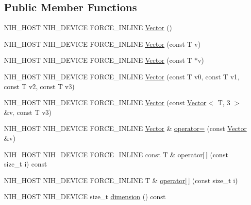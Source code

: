 \subsection*{\-Public \-Member \-Functions}
\begin{DoxyCompactItemize}
\item 
\-N\-I\-H\-\_\-\-H\-O\-S\-T \-N\-I\-H\-\_\-\-D\-E\-V\-I\-C\-E \-F\-O\-R\-C\-E\-\_\-\-I\-N\-L\-I\-N\-E \hyperlink{structnih_1_1_vector_3_01_t_00_014_01_4_a82429e0bb31f121a4787a4831211ff3e}{\-Vector} ()
\item 
\-N\-I\-H\-\_\-\-H\-O\-S\-T \-N\-I\-H\-\_\-\-D\-E\-V\-I\-C\-E \-F\-O\-R\-C\-E\-\_\-\-I\-N\-L\-I\-N\-E \hyperlink{structnih_1_1_vector_3_01_t_00_014_01_4_aeadd1de1e7d8f6c6f0b9eae4df2139ac}{\-Vector} (const \-T v)
\item 
\-N\-I\-H\-\_\-\-H\-O\-S\-T \-N\-I\-H\-\_\-\-D\-E\-V\-I\-C\-E \-F\-O\-R\-C\-E\-\_\-\-I\-N\-L\-I\-N\-E \hyperlink{structnih_1_1_vector_3_01_t_00_014_01_4_aa1df296862a41b5ede04d4cfaa928ed5}{\-Vector} (const \-T $\ast$v)
\item 
\-N\-I\-H\-\_\-\-H\-O\-S\-T \-N\-I\-H\-\_\-\-D\-E\-V\-I\-C\-E \-F\-O\-R\-C\-E\-\_\-\-I\-N\-L\-I\-N\-E \hyperlink{structnih_1_1_vector_3_01_t_00_014_01_4_a274c16835493414f7ab7d435ebac1cb1}{\-Vector} (const \-T v0, const \-T v1, const \-T v2, const \-T v3)
\item 
\-N\-I\-H\-\_\-\-H\-O\-S\-T \-N\-I\-H\-\_\-\-D\-E\-V\-I\-C\-E \-F\-O\-R\-C\-E\-\_\-\-I\-N\-L\-I\-N\-E \hyperlink{structnih_1_1_vector_3_01_t_00_014_01_4_a7dabe8e209dda0aa14af8d5e824512f2}{\-Vector} (const \hyperlink{structnih_1_1_vector}{\-Vector}$<$ \-T, 3 $>$ \&v, const \-T v3)
\item 
\-N\-I\-H\-\_\-\-H\-O\-S\-T \-N\-I\-H\-\_\-\-D\-E\-V\-I\-C\-E \*
\-F\-O\-R\-C\-E\-\_\-\-I\-N\-L\-I\-N\-E \hyperlink{structnih_1_1_vector}{\-Vector} \& \hyperlink{structnih_1_1_vector_3_01_t_00_014_01_4_a6a9e8b8320ccad22784092b356ee71be}{operator=} (const \hyperlink{structnih_1_1_vector}{\-Vector} \&v)
\item 
\-N\-I\-H\-\_\-\-H\-O\-S\-T \-N\-I\-H\-\_\-\-D\-E\-V\-I\-C\-E \*
\-F\-O\-R\-C\-E\-\_\-\-I\-N\-L\-I\-N\-E const \-T \& \hyperlink{structnih_1_1_vector_3_01_t_00_014_01_4_a45925acf4614936d4ed2cf9b84d584dd}{operator\mbox{[}$\,$\mbox{]}} (const size\-\_\-t i) const 
\item 
\-N\-I\-H\-\_\-\-H\-O\-S\-T \-N\-I\-H\-\_\-\-D\-E\-V\-I\-C\-E \*
\-F\-O\-R\-C\-E\-\_\-\-I\-N\-L\-I\-N\-E \-T \& \hyperlink{structnih_1_1_vector_3_01_t_00_014_01_4_a79ccc160edf52ff5892a9f7f7c6e54d3}{operator\mbox{[}$\,$\mbox{]}} (const size\-\_\-t i)
\item 
\-N\-I\-H\-\_\-\-H\-O\-S\-T \-N\-I\-H\-\_\-\-D\-E\-V\-I\-C\-E size\-\_\-t \hyperlink{structnih_1_1_vector_3_01_t_00_014_01_4_a22ae136785aff83dfc54b743ceeeacba}{dimension} () const 
\end{DoxyCompactItemize}
